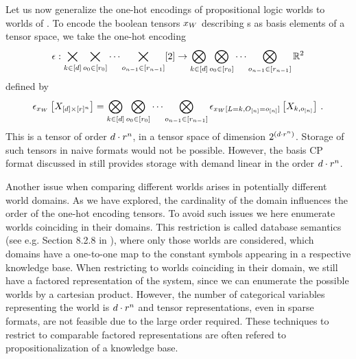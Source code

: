 Let us now generalize the one-hot encodings of propositional logic worlds to worlds of \firstOrderLogic{}.
To encode the boolean tensors $x_{W}$ describing \firstOrderLogic{}s as basis elements of a tensor space, we take the one-hot encoding
\begin{align*}
    \epsilon :
    \bigtimes_{k\in[d]}\bigtimes_{o_{0}\in[r_{0}]}\cdots\bigtimes_{o_{n-1}\in[r_{n-1}]} [2]
    \rightarrow \bigotimes_{k\in[d]}\bigotimes_{o_{0}\in[r_{0}]}\cdots\bigotimes_{o_{n-1}\in[r_{n-1}]} \mathbb{R}^2
\end{align*}
defined by
\begin{align*}
    \epsilon_{x_{W}}\left[X_{[d]\times[r]^{n}}\right]
    = \bigotimes_{k\in[d]}\bigotimes_{o_{0}\in[r_{0}]}\cdots\bigotimes_{o_{n-1}\in[r_{n-1}]}
    \epsilon_{x_{W}[L=k,O_{[n]}=o_{[n]}]}\left[X_{k,o_{[n]}}\right] \, .
\end{align*}
This is a tensor of order $d\cdot r^{n}$, in a tensor space of dimension $2^{\left(d\cdot r^{n}\right)}$.
Storage of such tensors in naive formats would not be possible.
However, the basis CP format discussed in  still provides storage with demand linear in the order $d\cdot r^{n}$.

Another issue when comparing different \firstOrderLogic{} worlds arises in potentially different world domains.
As we have explored, the cardinality of the domain influences the order of the one-hot encoding tensors.
To avoid such issues we here enumerate worlds coinciding in their domains.
This restriction is called database semantics (see e.g. Section 8.2.8 in \cite{russell_artificial_2021}), where only those worlds are considered, which domains have a one-to-one map to the constant symbols appearing in a respective knowledge base. %
When restricting to worlds coinciding in their domain, we still have a factored representation of the system, since we can enumerate the possible worlds by a cartesian product.
However, the number of categorical variables representing the world is $d\cdot r^{n}$ and tensor representations, even in sparse formats, are not feasible due to the large order required.
These techniques to restrict to comparable factored representations are often refered to propositionalization of a \firstOrderLogic{} knowledge base.

